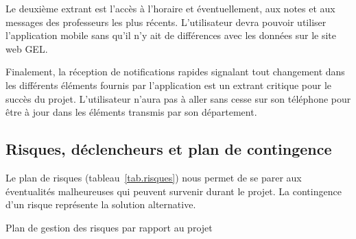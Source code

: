 	Le deuxième extrant est l’accès à l’horaire et éventuellement, aux notes et aux messages des professeurs les plus récents. L’utilisateur devra pouvoir utiliser l’application mobile sans qu'il n'y ait de différences avec les données sur le site web GEL.

	Finalement, la réception de notifications rapides signalant tout changement dans les différents éléments fournis par l’application est un extrant critique pour le succès du projet. L’utilisateur n'aura pas à aller sans cesse sur son téléphone pour être à jour dans les éléments transmis par son département.

	\subsection{Risques, déclencheurs et plan de contingence}
	Le plan de risques (tableau~\ref{tab.risques}) nous permet de se parer aux éventualités malheureuses qui peuvent survenir durant le projet. La contingence d'un risque représente la solution alternative.
	
	\begin{table}[hp]
		\centering
		
		\caption{Plan de gestion des risques par rapport au projet}
		\label{tab.risques}
	\end{table}